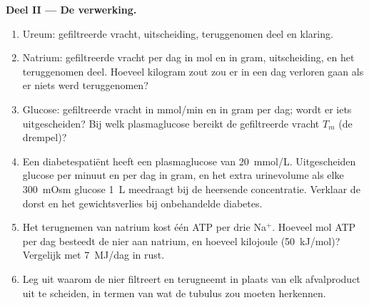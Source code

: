\begin{problem}
\medskip
\noindent\textbf{Deel II --- De verwerking.}
\begin{enumerate}[resume]
  \item Ureum: gefiltreerde vracht, uitscheiding, teruggenomen deel en
        klaring.
  \item Natrium: gefiltreerde vracht per dag in mol en in gram,
        uitscheiding, en het teruggenomen deel. Hoeveel kilogram zout
        zou er in een dag verloren gaan als er niets werd teruggenomen?
  \item Glucose: gefiltreerde vracht in mmol/min en in gram per dag;
        wordt er iets uitgescheiden? Bij welk plasmaglucose bereikt de
        gefiltreerde vracht $T_{m}$ (de drempel)?
  \item Een diabetespatiënt heeft een plasmaglucose van
        \qty{20}{mmol/L}. Uitgescheiden glucose per minuut en per dag
        in gram, en het extra urinevolume als elke \qty{300}{mOsm}
        glucose \qty{1}{L} meedraagt bij de heersende concentratie.
        Verklaar de dorst en het gewichtsverlies bij onbehandelde
        diabetes.
  \item Het terugnemen van natrium kost één ATP per drie Na$^{+}$.
        Hoeveel mol ATP per dag besteedt de nier aan natrium, en
        hoeveel kilojoule (\qty{50}{kJ/mol})? Vergelijk met
        \qty{7}{MJ/dag} in rust.
  \item Leg uit waarom de nier filtreert en terugneemt in plaats van
        elk afvalproduct uit te scheiden, in termen van wat de tubulus
        zou moeten herkennen.
\end{enumerate}


\end{problem}
